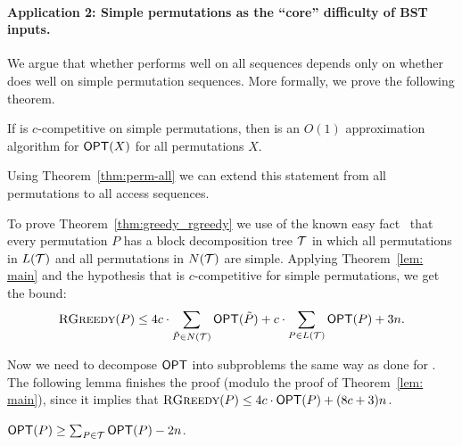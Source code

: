 \paragraph{Application 2: Simple permutations as the ``core'' difficulty of BST inputs.}  
We argue that whether \agreedy performs well on all sequences depends only on whether \greedy does well on simple permutation sequences. 
More formally, we prove the following theorem. 

\begin{theorem}
\label{thm:greedy_rgreedy} 
If \greedy is $c$-competitive on simple permutations, then \agreedy is an $O(1)$ approximation algorithm for $\mbox{\sf OPT}(X)$ for all permutations $X$. 
\end{theorem} 

Using Theorem~\ref{thm:perm-all} we can extend this statement from all permutations to all access sequences.

To prove Theorem~\ref{thm:greedy_rgreedy} we use of the known easy fact~\cite{brignall} that every permutation $P$ has a block decomposition tree ${\mathcal T}$ in which all permutations in $L({\mathcal T})$ and all permutations in $N({\mathcal T})$ are simple. Applying Theorem~\ref{lem: main} and the hypothesis that \greedy is $c$-competitive for simple permutations, we get the bound: 
\[\textsc{RGreedy}(P) \leq 4c \cdot \sum_{\tilde P \in  N({\mathcal T})} \mbox{\sf OPT}(\tilde P) + c \cdot \sum_{P \in L({\mathcal T})} \mbox{\sf OPT}(P) +3n.\]

 

Now we need to decompose $\mbox{\sf OPT}$ into subproblems the same way as done for \agreedy. 
The following lemma finishes the proof (modulo the proof of Theorem~\ref{lem: main}), since it implies that $\textsc{RGreedy}(P) \leq 4c \cdot \mbox{\sf OPT}(P) + (8c + 3)n$.  

\begin{lemma} 
\label{lem:decomp opt lower-bound}
$\mbox{\sf OPT}(P) \geq \sum_{P \in {\mathcal T} } \mbox{\sf OPT}(P) - 2n$.
\end{lemma}  

